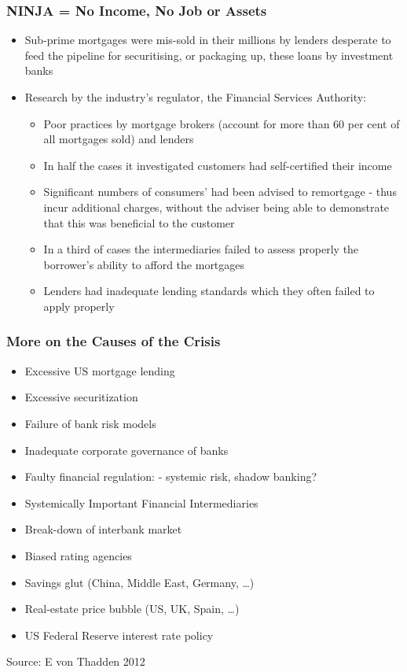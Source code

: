 \documentclass[11pt]{beamer}
\begin{document}
\begin{frame}
\frametitle{NINJA = No Income, No Job or Assets}
\begin{itemize}
\item Sub-prime mortgages were mis-sold in their millions by lenders desperate to feed the pipeline for securitising, or packaging up, these loans by investment banks
\item Research by the industry's regulator, the Financial Services Authority:
\begin{itemize}
\item Poor practices by mortgage brokers (account for more than 60 per cent of all mortgages sold) and lenders
\item In half the cases it investigated customers had self-certified their income
\item Significant numbers of consumers' had been advised to remortgage - thus incur additional charges, without the adviser being able to demonstrate that this was beneficial to the customer
\item In a third of cases the intermediaries failed to assess properly the borrower's ability to afford the mortgages
\item Lenders had inadequate lending standards which they often failed to apply properly
\end{itemize}
\end{itemize}
\end{frame}


\begin{frame}
\frametitle{More on the Causes of the Crisis}
\begin{itemize}
\item Excessive US mortgage lending
\item Excessive securitization
\item Failure of bank risk models
\item Inadequate corporate governance of banks
\item Faulty financial regulation: - systemic risk, shadow banking?
\item Systemically Important Financial Intermediaries
\item Break-down of interbank market
\item Biased rating agencies
\item Savings glut (China, Middle East, Germany, …)
\item Real-estate price bubble (US, UK, Spain, …)
\item US Federal Reserve interest rate policy
\end{itemize}
\tiny{Source: E von Thadden 2012}
\end{frame}
\end{document}

